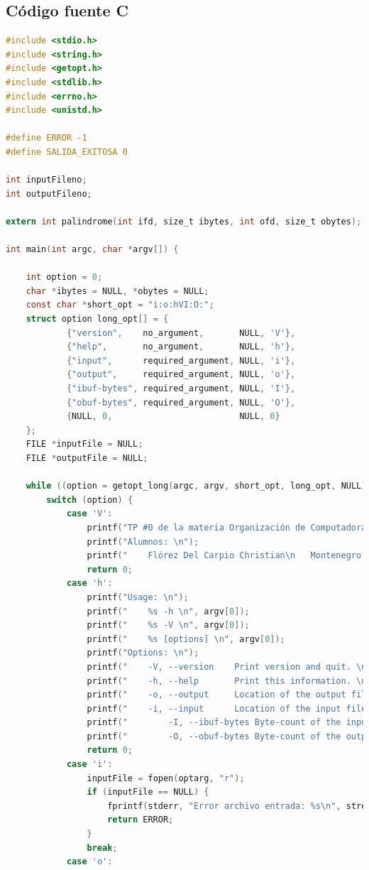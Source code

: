 \documentclass[a4paper]{article}
\begin{document}
\subsection{Código fuente C}
\begin{lstlisting}[language=C]
#include <stdio.h>
#include <string.h>
#include <getopt.h>
#include <stdlib.h>
#include <errno.h>
#include <unistd.h>

#define ERROR -1
#define SALIDA_EXITOSA 0

int inputFileno;
int outputFileno;

extern int palindrome(int ifd, size_t ibytes, int ofd, size_t obytes);

int main(int argc, char *argv[]) {

    int option = 0;
    char *ibytes = NULL, *obytes = NULL;
    const char *short_opt = "i:o:hVI:O:";
    struct option long_opt[] = {
            {"version",    no_argument,       NULL, 'V'},
            {"help",       no_argument,       NULL, 'h'},
            {"input",      required_argument, NULL, 'i'},
            {"output",     required_argument, NULL, 'o'},
            {"ibuf-bytes", required_argument, NULL, 'I'},
            {"obuf-bytes", required_argument, NULL, 'O'},
            {NULL, 0,                         NULL, 0}
    };
    FILE *inputFile = NULL;
    FILE *outputFile = NULL;

    while ((option = getopt_long(argc, argv, short_opt, long_opt, NULL)) != -1) {
        switch (option) {
            case 'V':
                printf("TP #0 de la materia Organización de Computadoras \n");
                printf("Alumnos: \n");
                printf("	Flórez Del Carpio Christian\n	Montenegro Josefina \n	Quino Lopez Julian \n");
                return 0;
            case 'h':
                printf("Usage: \n");
                printf("	%s -h \n", argv[0]);
                printf("	%s -V \n", argv[0]);
                printf("	%s [options] \n", argv[0]);
                printf("Options: \n");
                printf("	-V, --version    Print version and quit. \n");
                printf("	-h, --help       Print this information. \n");
                printf("	-o, --output     Location of the output file. \n");
                printf("	-i, --input      Location of the input file. \n");
                printf("        -I, --ibuf-bytes Byte-count of the input buffer. \n");
                printf("        -O, --obuf-bytes Byte-count of the output buffer. \n");
                return 0;
            case 'i':
                inputFile = fopen(optarg, "r");
                if (inputFile == NULL) {
                    fprintf(stderr, "Error archivo entrada: %s\n", strerror(errno));
                    return ERROR;
                }
                break;
            case 'o':


\end{lstlisting}
\end{document}

